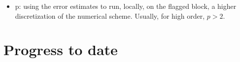 \documentclass{beamer}
\begin{document}
\begin{frame}
\begin{itemize}
\begin{minipage}[t][0.7\textheight]{0.95\textwidth}
\begin{exampleblock}{Launch abort vehicle example, [Nemec et al, 2008]}
\begin{figure}
\label{fig:LAVone}
\centering
{}
\end{figure}
\end{exampleblock}
\end{minipage}
\vspace{0pt}
\item p: using the error estimates to run, locally, on the flagged block, a higher discretization of the numerical scheme. Usually, for high order,  $ p > 2 $.


\end{itemize}
\end{frame}


\section[Progress]{Progress to date}
\end{document}
